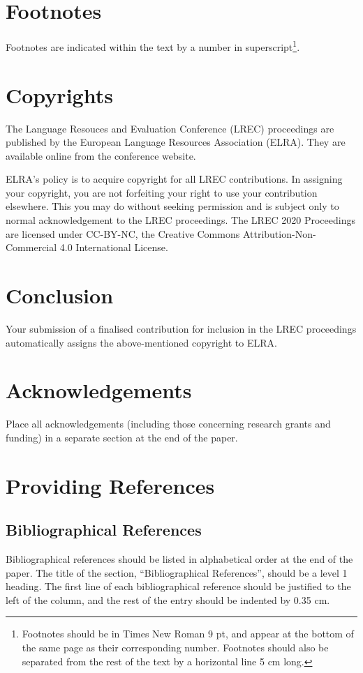 \documentclass[10pt, a4paper]{article}
\begin{document}
\section{Footnotes}

Footnotes are indicated within the text by a number in
superscript\footnote{Footnotes should be in Times New Roman 9 pt, and appear at
the bottom of the same page as their corresponding number. Footnotes should also
be separated from the rest of the text by a horizontal line 5 cm long.}.

\section{Copyrights}

The Language Resouces and Evaluation Conference (LREC)
proceedings are published by the European Language Resources Association (ELRA).
They are available online from the conference website.


ELRA's policy is to acquire copyright for all LREC contributions. In assigning
your copyright, you are not forfeiting your right to use your contribution
elsewhere. This you may do without seeking permission and is subject only to
normal acknowledgement to the LREC proceedings. The LREC 2020 Proceedings are
licensed under CC-BY-NC, the Creative Commons Attribution-Non-Commercial 4.0
International License.

\section{Conclusion}

Your submission of a finalised contribution for inclusion in the LREC
proceedings automatically assigns the above-mentioned copyright to ELRA.

\section{Acknowledgements}

Place all acknowledgements (including those concerning research grants and
funding) in a separate section at the end of the paper.

\section{Providing References}

\subsection{Bibliographical References}
Bibliographical references should be listed in alphabetical order at the
end of the paper. The title of the section, ``Bibliographical References'',
should be a level 1 heading. The first line of each bibliographical reference
should be justified to the left of the column, and the rest of the entry should
be indented by 0.35 cm.
\end{document}
